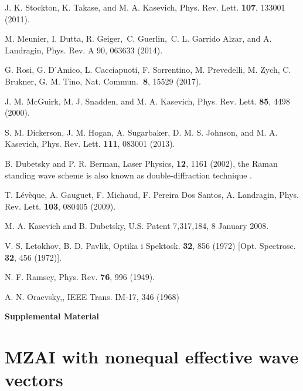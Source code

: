 \documentclass[twocolumn,showpacs,preprintnumbers]{revtex4}
\begin{document}
\begin{thebibliography}{99}
 J. K. Stockton, K. Takase, and M. A. Kasevich, Phys. Rev.
Lett. \textbf{107}, 133001 (2011).

 M. Meunier, I. Dutta, R. Geiger,\ C. Guerlin,\ C. L. Garrido
Alzar, and A. Landragin, Phys. Rev. A 90, 063633 (2014).

 G. Rosi, G. D'Amico, L. Cacciapuoti, F. Sorrentino, M.
Prevedelli, M. Zych, C. Brukner, G. M. Tino, Nat. Commun.\textbf{\ 8}, 15529
(2017).

 J. M. McGuirk, M. J. Snadden, and M. A. Kasevich, Phys. Rev.
Lett. \textbf{85}, 4498 (2000).

 S. M. Dickerson, J. M. Hogan, A. Sugarbaker, D. M. S. Johnson,
and M. A. Kasevich, Phys. Rev. Lett. \textbf{111}, 083001 (2013).

 B. Dubetsky and P. R. Berman, Laser Physics, \textbf{12}, 1161
(2002), the Raman standing wave scheme is also known as double-diffraction
technique \cite{c13}.

 T. L\'{e}v\`{e}que, A. Gauguet, F. Michaud, F. Pereira Dos
Santos, A. Landragin, Phys. Rev. Lett. \textbf{103}, 080405 (2009).

 M. A. Kasevich and B. Dubetsky, U.S. Patent 7,317,184, 8
January 2008.

 V. S. Letokhov, B. D. Pavlik, Optika i Spektosk. \textbf{32},
856 (1972) [Opt. Spectrosc. \textbf{32}, 456 (1972)].

 N. F. Ramsey, Phys. Rev. \textbf{76}, 996 (1949).

 A. N. Oraevsky,, IEEE Trans. IM-17, 346 (1968)
\end{thebibliography}

\onecolumngrid
\newpage

\appendix

\begin{center}
{\Large \textbf{Supplemental Material }}
\end{center}

\section{\label{a}MZAI with nonequal effective wave vectors}
\end{document}
